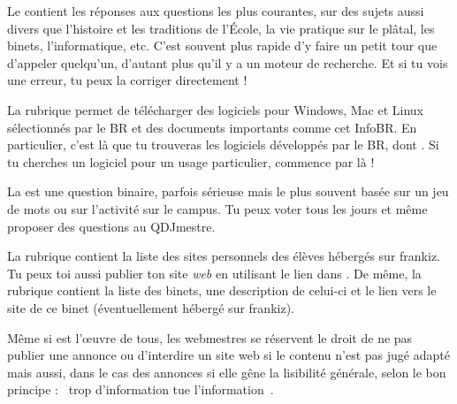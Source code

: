 Le  contient les r\'eponses aux questions les plus courantes, sur des sujets aussi divers que l'histoire et les traditions de l'\'Ecole, la
vie pratique sur le pl\^atal, les binets, l'informatique, etc. C'est souvent plus rapide d'y faire un petit tour que d'appeler quelqu'un, d'autant plus qu'il y a
un moteur de recherche. Et si tu vois une erreur, tu peux la corriger directement !

La rubrique  permet de t\'el\'echarger des logiciels pour
Windows, Mac et Linux s\'electionn\'es par le BR et des documents
importants comme cet InfoBR. En particulier, c'est l\`a  que tu
trouveras les logiciels d\'evelopp\'es par le BR, dont . Si
tu cherches un logiciel pour un usage particulier, commence par l\`a  !


La  est une question binaire, parfois s\'erieuse mais le
plus souvent bas\'ee sur un jeu de mots ou sur l'activit\'e sur le
campus. Tu peux voter tous les jours et m\^eme proposer des questions
au QDJmestre.

La rubrique  contient la liste des sites personnels des \'el\`eves h\'eberg\'es sur frankiz. Tu peux toi aussi publier ton site \emph{web} en
utilisant le lien dans . De m\^eme, la rubrique  contient la liste des binets, une description de celui-ci et le lien
vers le site de ce binet (\'eventuellement h\'eberg\'e sur frankiz).

M\^eme si \fkz est l'\oe uvre de tous, les webmestres se r\'eservent le droit de ne pas publier une annonce ou d'interdire un site web si le contenu
n'est pas jug\'e adapt\'e mais aussi, dans le cas des annonces si elle g\^ene la lisibilit\'e g\'en\'erale, selon le bon principe : \guillemotleft~trop
d'information tue l'information~\guillemotright .

